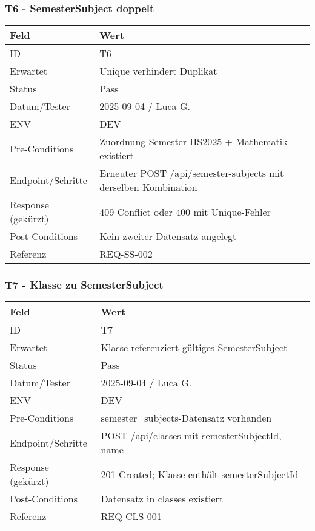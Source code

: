 \documentclass[12pt,a4paper]{article}
\begin{document}
    \subsubsection{T6 - SemesterSubject doppelt}
    {\small
        \begin{tabularx}{\textwidth}{|p{3.2cm}|X|}
            \hline
            \textbf{Feld} & \textbf{Wert} \\ \hline
            ID & T6 \\ \hline
            Erwartet & Unique verhindert Duplikat \\ \hline
            Status & Pass \\ \hline
            Datum/Tester & 2025-09-04 / Luca G. \\ \hline
            ENV & DEV \\ \hline
            Pre-Conditions & Zuordnung Semester HS2025 + Mathematik existiert \\ \hline
            Endpoint/Schritte & Erneuter POST /api/semester-subjects mit derselben Kombination \\ \hline
            Response (gekürzt) & 409 Conflict oder 400 mit Unique-Fehler \\ \hline
            Post-Conditions & Kein zweiter Datensatz angelegt \\ \hline
            Referenz & REQ-SS-002 \\ \hline
        \end{tabularx}
    }

    \subsubsection{T7 - Klasse zu SemesterSubject}
    {\small
        \begin{tabularx}{\textwidth}{|p{3.2cm}|X|}
            \hline
            \textbf{Feld} & \textbf{Wert} \\ \hline
            ID & T7 \\ \hline
            Erwartet & Klasse referenziert gültiges SemesterSubject \\ \hline
            Status & Pass \\ \hline
            Datum/Tester & 2025-09-04 / Luca G. \\ \hline
            ENV & DEV \\ \hline
            Pre-Conditions & semester_subjects-Datensatz vorhanden \\ \hline
            Endpoint/Schritte & POST /api/classes mit {semesterSubjectId, name} \\ \hline
            Response (gekürzt) & 201 Created; Klasse enth\"alt semesterSubjectId \\ \hline
            Post-Conditions & Datensatz in classes existiert \\ \hline
            Referenz & REQ-CLS-001 \\ \hline
        \end{tabularx}
    }
\end{document}

